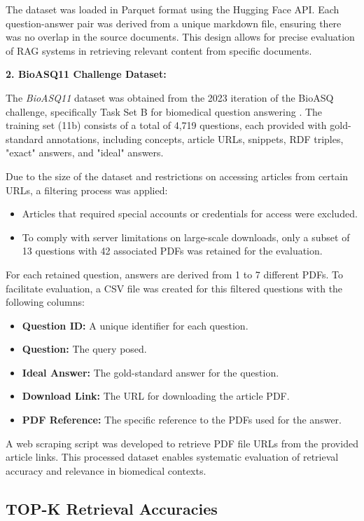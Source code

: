 \documentclass{scrartcl}
\begin{document}
The dataset was loaded in Parquet format using the Hugging Face API. Each question-answer pair was derived from a unique markdown file, ensuring there was no overlap in the source documents. This design allows for precise evaluation of RAG systems in retrieving relevant content from specific documents.

\textbf{2. BioASQ11 Challenge Dataset:}

The \textit{BioASQ11} dataset was obtained from the 2023 iteration of the BioASQ challenge, specifically Task Set B for biomedical question answering \cite{bioasq2023}. The training set (11b) consists of a total of 4,719 questions, each provided with gold-standard annotations, including concepts, article URLs, snippets, RDF triples, "exact" answers, and "ideal" answers.

Due to the size of the dataset and restrictions on accessing articles from certain URLs, a filtering process was applied:
\begin{itemize}
    \item Articles that required special accounts or credentials for access were excluded.
    \item To comply with server limitations on large-scale downloads, only a subset of 13 questions with 42 associated PDFs was retained for the evaluation.
\end{itemize}

For each retained question, answers are derived from 1 to 7 different PDFs. To facilitate evaluation, a CSV file was created for this filtered questions with the following columns:
\begin{itemize}
    \item \textbf{Question ID:} A unique identifier for each question.
    \item \textbf{Question:} The query posed.
    \item \textbf{Ideal Answer:} The gold-standard answer for the question.
    \item \textbf{Download Link:} The URL for downloading the article PDF.
    \item \textbf{PDF Reference:} The specific reference to the PDFs used for the answer.
\end{itemize}

A web scraping script was developed to retrieve PDF file URLs from the provided article links. This processed dataset enables systematic evaluation of retrieval accuracy and relevance in biomedical contexts.

\subsection{TOP-K Retrieval Accuracies}
\end{document}
